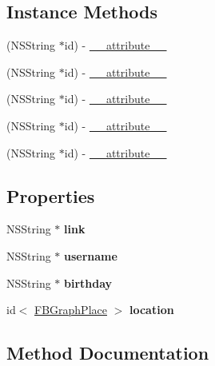 \subsection*{Instance Methods}
\begin{DoxyCompactItemize}
\item 
(N\+S\+String $\ast$id) -\/ \hyperlink{protocolFBGraphUser-p_af9c6c49d1138ab6f19bf6759a18b53f9}{\+\_\+\+\_\+attribute\+\_\+\+\_\+}
\item 
(N\+S\+String $\ast$id) -\/ \hyperlink{protocolFBGraphUser-p_af9c6c49d1138ab6f19bf6759a18b53f9}{\+\_\+\+\_\+attribute\+\_\+\+\_\+}
\item 
(N\+S\+String $\ast$id) -\/ \hyperlink{protocolFBGraphUser-p_af9c6c49d1138ab6f19bf6759a18b53f9}{\+\_\+\+\_\+attribute\+\_\+\+\_\+}
\item 
(N\+S\+String $\ast$id) -\/ \hyperlink{protocolFBGraphUser-p_af9c6c49d1138ab6f19bf6759a18b53f9}{\+\_\+\+\_\+attribute\+\_\+\+\_\+}
\item 
(N\+S\+String $\ast$id) -\/ \hyperlink{protocolFBGraphUser-p_af9c6c49d1138ab6f19bf6759a18b53f9}{\+\_\+\+\_\+attribute\+\_\+\+\_\+}
\end{DoxyCompactItemize}
\subsection*{Properties}
\begin{DoxyCompactItemize}
\item 
\mbox{\label{protocolFBGraphUser-p_af2ca12ea0032e42aa657214b051edf06}} 
N\+S\+String $\ast$ {\bfseries link}
\item 
\mbox{\label{protocolFBGraphUser-p_a5cf402ea6810dc47b37000f975ea90ae}} 
N\+S\+String $\ast$ {\bfseries username}
\item 
\mbox{\label{protocolFBGraphUser-p_a1e3a84e7851ac67a9a181e59b5931119}} 
N\+S\+String $\ast$ {\bfseries birthday}
\item 
\mbox{\label{protocolFBGraphUser-p_a617867e028a493904af12a4ef3cc7059}} 
id$<$ \hyperlink{protocolFBGraphPlace-p}{F\+B\+Graph\+Place} $>$ {\bfseries location}
\end{DoxyCompactItemize}


\subsection{Method Documentation}
\mbox{\label{protocolFBGraphUser-p_af9c6c49d1138ab6f19bf6759a18b53f9}} 
